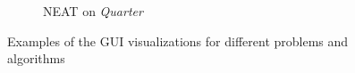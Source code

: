 \begin{figure}
\begin{subfigure}{0.5\textwidth}
        \caption{NEAT on \textit{Quarter}}
    \end{subfigure}%
    \caption{Examples of the GUI visualizations for different problems and algorithms}
    \label{fig:gui_screenshots}
\end{figure}
